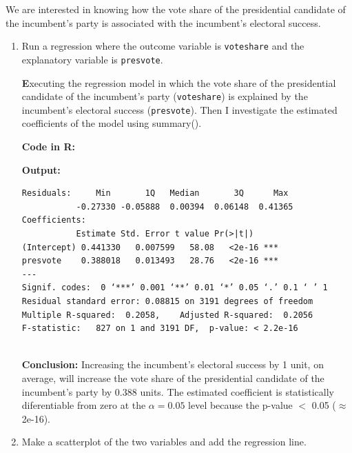 \documentclass[12pt,letterpaper]{article}
\begin{document}
\noindent We are interested in knowing how the vote share of the presidential candidate of the incumbent's party is associated with the incumbent's electoral success.
	\vspace{.25cm}
	\begin{enumerate}
		\item Run a regression where the outcome variable is \texttt{voteshare} and the explanatory variable is \texttt{presvote}.
			\vspace{0.5cm}
			
				\noindent \textbf Executing the regression model in which the vote share of the presidential candidate of the incumbent's party (\texttt{voteshare}) is explained by the incumbent's electoral success (\texttt{presvote}). Then I investigate the estimated coefficients of the model using summary(). \vspace{0.5cm}
			
			\noindent \textbf{Code in R:}
			  
			\vspace{.25cm}
			
			\noindent \textbf{Output: }
							\begin{footnotesize}
			\begin{verbatim}
Residuals:     Min       1Q   Median       3Q      Max 
           -0.27330 -0.05888  0.00394  0.06148  0.41365 
Coefficients:            
           Estimate Std. Error t value Pr(>|t|)    
(Intercept) 0.441330   0.007599   58.08   <2e-16 ***
presvote    0.388018   0.013493   28.76   <2e-16 ***
---
Signif. codes:  0 ‘***’ 0.001 ‘**’ 0.01 ‘*’ 0.05 ‘.’ 0.1 ‘ ’ 1
Residual standard error: 0.08815 on 3191 degrees of freedom
Multiple R-squared:  0.2058,	Adjusted R-squared:  0.2056 
F-statistic:   827 on 1 and 3191 DF,  p-value: < 2.2e-16			
				
			\end{verbatim}  
							\end{footnotesize}
			\vspace{.25cm}
			
			\noindent \textbf{Conclusion:} Increasing the incumbent's electoral success by 1 unit, on average, will increase the vote share of the presidential candidate of the incumbent's party by 0.388 units. The estimated coefficient is statistically diferentiable from zero at the  $\alpha=0.05$ level because the p-value $<$ 0.05 ($\approx $2e-16).
			\vspace{1 cm}
			
		\item Make a scatterplot of the two variables and add the regression line. 
			\vspace{0.5cm}
			

\end{enumerate}
\end{document}
